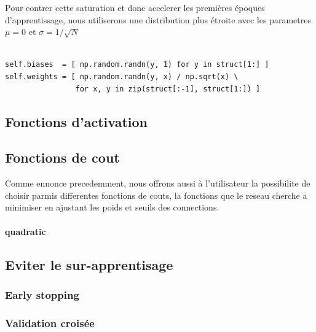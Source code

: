 \documentclass[11pt]{article}
\begin{document}
Pour contrer cette saturation et donc accelerer les premi\`eres \'epoques
d'apprentissage, nous utiliserons une distribution plus \'etroite avec les
parametres $\mu=0$ et $\sigma =1/\sqrt{N}$ \\


 \\
\begin{lstlisting}
self.biases  = [ np.random.randn(y, 1) for y in struct[1:] ]
self.weights = [ np.random.randn(y, x) / np.sqrt(x) \
				for x, y in zip(struct[:-1], struct[1:]) ]
\end{lstlisting}


\subsection{Fonctions d'activation}



\subsection{Fonctions de cout}
Comme ennonce precedemment, nous offrons aussi \`a l'utilisateur la possibilite
de choisir parmis differentes fonctions de couts, la fonctions que le reseau
cherche a minimiser en ajustant les poids et seuils des connections.
\paragraph{quadratic}

\subsection{Eviter le sur-apprentisage}
\subsubsection{Early stopping}
\subsubsection{Validation crois\'ee}
\end{document}
